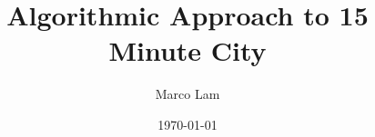 \documentclass[oneside]{book}
\title{Algorithmic Approach to 15 Minute City}
\author{Marco Lam}
\date{\today}
\newcommand\summaryname{Abstract}
\newenvironment{Abstract}%
    {\small\begin{center}%
    \bfseries{\summaryname} \end{center}}
\begin{document}
\maketitle

\begin{Abstract}
    \begin{changemargin}{1cm}{1cm}
    \lipsum[10]
    \end{changemargin}
\end{Abstract}

\newpage

\tableofcontents
\listoffigures
\listoftables
\listofalgorithms
\newpage

\chapter{Introduction}

{1_intro}

\newpage

\chapter{Previous Work}

{2_previous_work}

\newpage

\chapter{Problem Statement}

{3_problem_statement}

\newpage

\chapter{Proposed Solutions}

{4_proposed_solution}

\newpage


\end{document}
